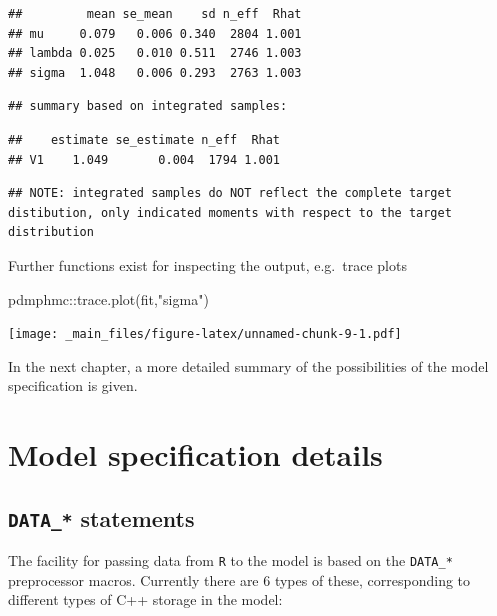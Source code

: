 \documentclass[
]{book}
\newenvironment{Shaded}{\begin{snugshade}}{\end{snugshade}}
\newcommand{\FunctionTok}[1]{\textcolor[rgb]{0.00,0.00,0.00}{#1}}
\newcommand{\NormalTok}[1]{#1}
\newcommand{\SpecialCharTok}[1]{\textcolor[rgb]{0.00,0.00,0.00}{#1}}
\newcommand{\StringTok}[1]{\textcolor[rgb]{0.31,0.60,0.02}{#1}}
\begin{document}
\begin{verbatim}
##         mean se_mean    sd n_eff  Rhat
## mu     0.079   0.006 0.340  2804 1.001
## lambda 0.025   0.010 0.511  2746 1.003
## sigma  1.048   0.006 0.293  2763 1.003
\end{verbatim}

\begin{verbatim}
## summary based on integrated samples:
\end{verbatim}

\begin{verbatim}
##    estimate se_estimate n_eff  Rhat
## V1    1.049       0.004  1794 1.001
\end{verbatim}

\begin{verbatim}
## NOTE: integrated samples do NOT reflect the complete target distibution, only indicated moments with respect to the target distribution
\end{verbatim}

Further functions exist for inspecting the output, e.g.~trace plots

\begin{Shaded}
\begin{Highlighting}[]
\NormalTok{pdmphmc}\SpecialCharTok{::}\FunctionTok{trace.plot}\NormalTok{(fit,}\StringTok{"sigma"}\NormalTok{)}
\end{Highlighting}
\end{Shaded}

\texttt{[image: \_main\_files/figure-latex/unnamed-chunk-9-1.pdf]}

In the next chapter, a more detailed summary of the possibilities of the model specification is given.

\hypertarget{model-specification-details}{%
\chapter{Model specification details}\label{model-specification-details}}

\hypertarget{data_-statements}{%
\section{\texorpdfstring{\texttt{DATA\_*} statements}{DATA\_* statements}}\label{data_-statements}}

The facility for passing data from \texttt{R} to the model is based on the \texttt{DATA\_*} preprocessor macros. Currently there are 6 types of these, corresponding to different types of C++ storage in the model:
\end{document}
